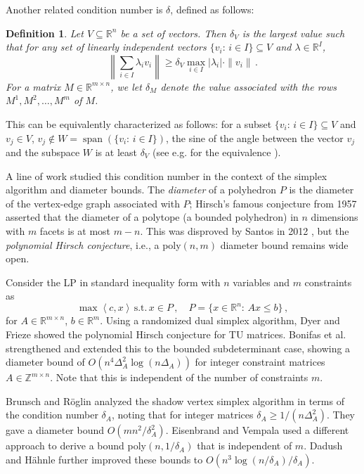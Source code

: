 \documentclass[11pt, a4paper]{article}
\newcommand{\pr}[2]{\left\langle #1, #2 \right\rangle}
\newcommand{\1}{\mathbbm{1}}
\newcommand{\st}{\mathrm{s.t.}}
\newcommand{\spn}{\operatorname{span}}
\newtheorem{Def}[theorem]{Definition}
\theoremstyle{case}
\newcommand{\R}{\mathbb{R}}
\newcommand{\Z}{\mathbb{Z}}
\begin{document}
Another related condition number is $\delta$, defined as follows:
\begin{Def}\label{def:delta}
Let $V\subseteq \R^n$ be a set of vectors. Then
$\delta_V$ is the largest value such that for any set of linearly independent vectors $\{v_i:\,  i\in I\}\subseteq V$ and $\lambda\in \R^I$,
\[
\left\|\sum_{i\in I}\lambda_i v_i\right\|\ge \delta_V \max_{i \in I} |\lambda_i| \cdot\|v_i\|\, .
\]
For a matrix $M\in\R^{m\times n}$, we let $\delta_M$ denote the value associated with the rows $M^1,M^2,\ldots,M^m$ of $M$.
\end{Def}
This can be equivalently characterized as follows: for a subset  $\{v_i:\,  i\in I\}\subseteq V$ and $v_j \in V$,  $v_j\notin W=\spn(\{v_i:\,  i\in I\})$,   the sine of the angle between the vector  $v_j$ and the subspace $W$ is at least $\delta_V$ (see e.g. for the equivalence \cite{Dadush-oracle}).

A line of work studied this condition number in the context of the simplex algorithm and diameter bounds. The \emph{diameter} of a polyhedron $P$ is the diameter of the vertex-edge graph associated with $P$; Hirsch's famous conjecture from 1957 asserted that the diameter of a polytope (a bounded polyhedron) in $n$ dimensions with $m$ facets is at most $m-n$. This was disproved by Santos in 2012 \cite{santos2012}, but the \emph{polynomial Hirsch conjecture}, i.e., a poly$(n,m)$ diameter bound remains wide open.

Consider the LP in standard inequality form with $n$ variables and $m$ constraints as 
\begin{equation}\label{LP:ineq}
\max \pr{c}{x}\, \st\,  x\in P\, ,\quad P=\{x\in \R^n:\, Ax\le b\}\, ,
\end{equation}
for $A\in \R^{m\times n}$, $b\in \R^m$.
Using a randomized dual simplex algorithm, Dyer and Frieze \cite{Dyer1994} showed the polynomial Hirsch conjecture for TU matrices. Bonifas et al.~\cite{Bonifas2014} strengthened and extended this to the bounded subdeterminant case, showing a diameter bound of $O(n^4\Delta_A^2 \log(n\Delta_A))$ for integer constraint matrices $A\in\Z^{m\times n}$. Note that this is independent of the number of constraints $m$.

Brunsch and R\"oglin \cite{brunsch2013} analyzed the shadow vertex simplex algorithm in terms of the condition number $\delta_A$, noting that for integer matrices $\delta_A\ge 1/(n\Delta_A^2)$. They gave a diameter bound $O(mn^2/\delta^2_A)$.
 Eisenbrand and Vempala \cite{eisenbrand2017} used a different approach to derive a bound poly$(n,1/\delta_A)$ that is independent of $m$.  Dadush and H\"ahnle \cite{dadush2016shadow} further improved these bounds to $O(n^3\log(n/\delta_A)/\delta_A)$.
\end{document}
